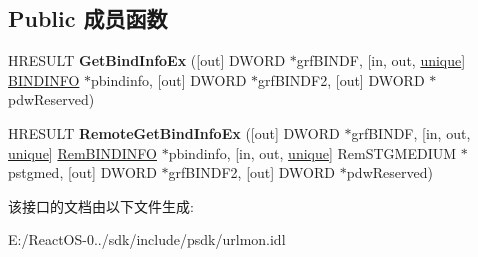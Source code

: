 \subsection*{Public 成员函数}
\begin{DoxyCompactItemize}
\item 
\mbox{\label{interface_i_bind_status_callback_ex_a7c5e31dfa03e2e70c3c7a472ca4c6322}} 
H\+R\+E\+S\+U\+LT {\bfseries Get\+Bind\+Info\+Ex} (\mbox{[}out\mbox{]} D\+W\+O\+RD $\ast$grf\+B\+I\+N\+DF, \mbox{[}in, out, \hyperlink{interfaceunique}{unique}\mbox{]} \hyperlink{struct_i_bind_status_callback_1_1__tag_b_i_n_d_i_n_f_o}{B\+I\+N\+D\+I\+N\+FO} $\ast$pbindinfo, \mbox{[}out\mbox{]} D\+W\+O\+RD $\ast$grf\+B\+I\+N\+D\+F2, \mbox{[}out\mbox{]} D\+W\+O\+RD $\ast$pdw\+Reserved)
\item 
\mbox{\label{interface_i_bind_status_callback_ex_aee897f2b8cfd4b948c093be190d5ffb1}} 
H\+R\+E\+S\+U\+LT {\bfseries Remote\+Get\+Bind\+Info\+Ex} (\mbox{[}out\mbox{]} D\+W\+O\+RD $\ast$grf\+B\+I\+N\+DF, \mbox{[}in, out, \hyperlink{interfaceunique}{unique}\mbox{]} \hyperlink{struct_i_bind_status_callback_1_1__tag_rem_b_i_n_d_i_n_f_o}{Rem\+B\+I\+N\+D\+I\+N\+FO} $\ast$pbindinfo, \mbox{[}in, out, \hyperlink{interfaceunique}{unique}\mbox{]} Rem\+S\+T\+G\+M\+E\+D\+I\+UM $\ast$pstgmed, \mbox{[}out\mbox{]} D\+W\+O\+RD $\ast$grf\+B\+I\+N\+D\+F2, \mbox{[}out\mbox{]} D\+W\+O\+RD $\ast$pdw\+Reserved)
\end{DoxyCompactItemize}


该接口的文档由以下文件生成\+:\begin{DoxyCompactItemize}
\item 
E\+:/\+React\+O\+S-\/0../sdk/include/psdk/urlmon.\+idl\end{DoxyCompactItemize}
